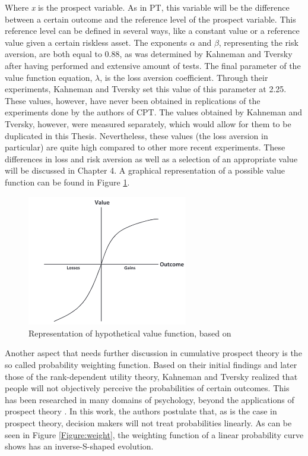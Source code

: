 Where \textit{x} is the prospect variable. As in PT, this variable will be the difference between a certain outcome and the reference level of the prospect variable. This reference level can be defined in several ways, like a constant value or a reference value given a certain riskless asset. The exponents $\alpha$ and $\beta$, representing the risk aversion, are both equal to 0.88, as was determined by Kahneman and Tversky after having performed and extensive amount of tests. The final parameter of the value function equation, $\lambda$, is the loss aversion coefficient. Through their experiments, Kahneman and Tversky set this value of this parameter at 2.25. These values, however, have never been obtained in replications of the experiments done by the authors of CPT. The values obtained by Kahneman and Tversky, however, were measured separately, which would allow for them to be duplicated in this Thesis. Nevertheless, these values (the loss aversion in particular) are quite high compared to other more recent experiments. These differences in loss and risk aversion as well as a selection of an appropriate value will be discussed in Chapter 4. A graphical representation of a possible value function can be found in Figure
\ref{Figure:value}.   
\newline 
\begin{figure}[h!]
\centering
\includegraphics[width=7cm]{ValueFunction.PNG}
\caption[Representation of hypothetical value function]{Representation of hypothetical value function, based on \cite{prospect2}}
\label{Figure:value}
\end{figure}
\newline \noindent
Another aspect that needs further discussion in cumulative prospect theory is the so called probability weighting function. Based on their initial findings and later those of the rank-dependent utility theory, Kahneman and Tversky realized that people will not objectively perceive the probabilities of certain outcomes. This has been researched in many domains of psychology, beyond the applications of prospect theory \cite{Weighting}. In this work, the authors postulate that, as is the case in prospect theory, decision makers will not treat probabilities linearly. As can be seen in Figure \ref{Figure:weight}, the weighting function of a linear probability curve shows has an inverse-S-shaped evolution. 
